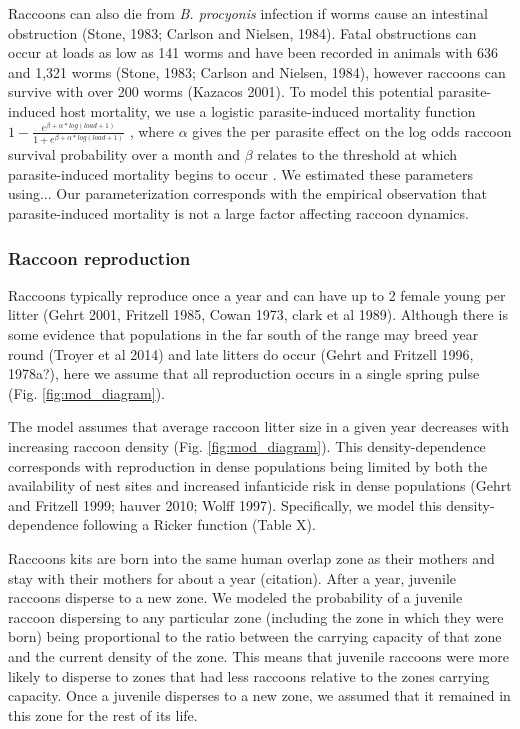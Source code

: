 \documentclass[11pt]{article}
\begin{document}
Raccoons can also die from \emph{B. procyonis} infection if worms cause
an intestinal obstruction (Stone, 1983; Carlson and Nielsen, 1984).
Fatal obstructions can occur at loads as low as 141 worms and have been
recorded in animals with 636 and 1,321 worms (Stone, 1983; Carlson and
Nielsen, 1984), however raccoons can survive with over 200 worms
(Kazacos 2001). To model this potential parasite-induced host mortality,
we use a logistic parasite-induced mortality function
\(1 - \frac{e^{\beta + \alpha*log(load + 1)}}{1 + e^{\beta + \alpha*log(load + 1)}}\)
, where $\alpha$ gives the per parasite effect on the log
odds raccoon survival probability over a month and $\beta$ relates to the threshold at which parasite-induced mortality begins
to occur \citep{Wilber2016}. We estimated these parameters using... Our parameterization corresponds with the empirical observation that parasite-induced mortality is not a large factor affecting raccoon dynamics.

\subsubsection{Raccoon reproduction}

Raccoons typically reproduce once a year and can have up to 2 female
young per litter (Gehrt 2001, Fritzell 1985, Cowan 1973, clark et al
1989). Although there is some evidence that populations in the far south
of the range may breed year round (Troyer et al 2014) and late litters
do occur (Gehrt and Fritzell 1996, 1978a?), here we assume that all
reproduction occurs in a single spring pulse (Fig. \ref{fig:mod_diagram}).

The model assumes that average raccoon litter size in a given year
decreases with increasing raccoon density (Fig. \ref{fig:mod_diagram}). This density-dependence
corresponds with reproduction in dense populations being limited by both
the availability of nest sites and increased infanticide risk in dense
populations (Gehrt and Fritzell 1999; hauver 2010; Wolff 1997).
Specifically, we model this density-dependence following a Ricker
function (Table X).

Raccoons kits are born into the same human overlap zone as their mothers and stay with their mothers for about a year (citation).  After a year, juvenile raccoons disperse to a new zone. We modeled the probability of a juvenile raccoon dispersing to any particular zone (including the zone in which they were born) being proportional to the ratio between the carrying capacity of that zone and the current density of the zone. This means that juvenile raccoons were more likely to disperse to zones that had less raccoons relative to the zones carrying capacity.  Once a juvenile disperses to a new zone, we assumed that it remained in this zone for the rest of its life. 
\end{document}
